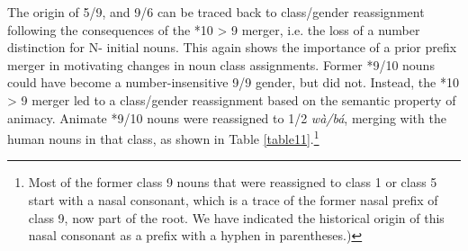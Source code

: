 \documentclass[output=paper,,modfonts,nonflat]{langsci/langscibook-Hyman-et-al}
\begin{document}
The origin of 5/9, and 9/6 can be traced back to class/gender reassignment following the consequences of the *10 > 9 merger, i.e. the loss of a number distinction for N- initial nouns. This again shows the importance of a prior prefix merger in motivating changes in noun class assignments. Former *9/10 nouns could have become a number-insensitive 9/9 gender, but did not. Instead, the *10 > 9 merger led to a class/gender reassignment based on the semantic property of animacy. Animate *9/10 nouns were reassigned to 1/2 \textit{wà/bá}, merging with the human nouns in that class, as shown in Table \ref{table11}.\footnote{Most of the former class 9 nouns that were reassigned to class 1 or class 5 start with a nasal consonant, which is a trace of the former nasal prefix of class 9, now part of the root. We have indicated the historical origin of this nasal consonant as a prefix with a hyphen in parentheses.)}


\end{document}
